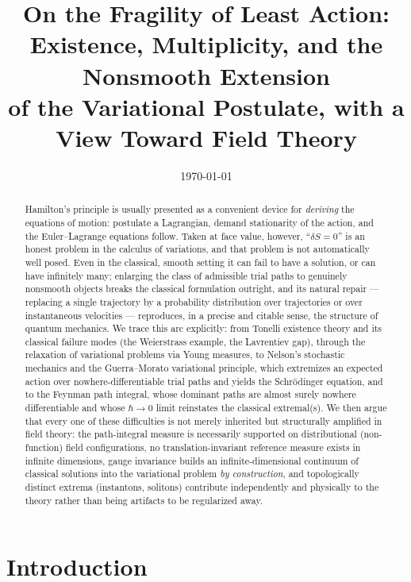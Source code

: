 \documentclass[11pt]{article}
\title{On the Fragility of Least Action:\\
Existence, Multiplicity, and the Nonsmooth Extension\\
of the Variational Postulate, with a View Toward Field Theory}
\date{\today}
\begin{document}
\maketitle

\begin{abstract}
\noindent
Hamilton's principle is usually presented as a convenient device for \emph{deriving} the equations of motion: postulate a Lagrangian, demand stationarity of the action, and the Euler--Lagrange equations follow. Taken at face value, however, ``$\delta S=0$'' is an honest problem in the calculus of variations, and that problem is not automatically well posed. Even in the classical, smooth setting it can fail to have a solution, or can have infinitely many; enlarging the class of admissible trial paths to genuinely nonsmooth objects breaks the classical formulation outright, and its natural repair --- replacing a single trajectory by a probability distribution over trajectories or over instantaneous velocities --- reproduces, in a precise and citable sense, the structure of quantum mechanics. We trace this arc explicitly: from Tonelli existence theory and its classical failure modes (the Weierstrass example, the Lavrentiev gap), through the relaxation of variational problems via Young measures, to Nelson's stochastic mechanics and the Guerra--Morato variational principle, which extremizes an expected action over nowhere-differentiable trial paths and yields the Schr\"odinger equation, and to the Feynman path integral, whose dominant paths are almost surely nowhere differentiable and whose $\hbar\to 0$ limit reinstates the classical extremal(s). We then argue that every one of these difficulties is not merely inherited but structurally amplified in field theory: the path-integral measure is necessarily supported on distributional (non-function) field configurations, no translation-invariant reference measure exists in infinite dimensions, gauge invariance builds an infinite-dimensional continuum of classical solutions into the variational problem \emph{by construction}, and topologically distinct extrema (instantons, solitons) contribute independently and physically to the theory rather than being artifacts to be regularized away.
\end{abstract}

\tableofcontents

\section{Introduction}
\end{document}
